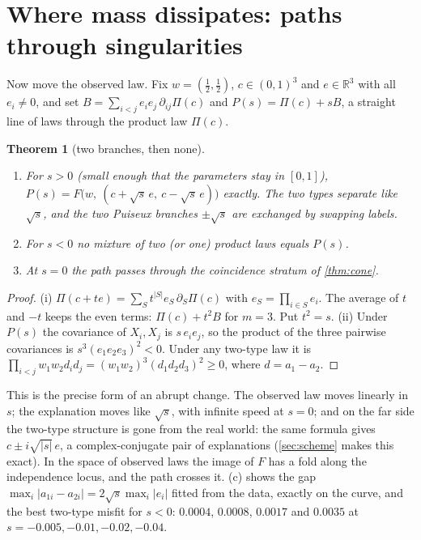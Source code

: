 \documentclass[11pt]{article}
\newtheorem{theorem}{Theorem}\newtheorem{proposition}[theorem]{Proposition}\newtheorem{corollary}[theorem]{Corollary}
\theoremstyle{definition}\newtheorem{definition}[theorem]{Definition}\newtheorem{remark}[theorem]{Remark}\newtheorem{example}[theorem]{Example}
\newcommand{\R}{\mathbb R}
\begin{document}
\section{Where mass dissipates: paths through singularities}\label{sec:puiseux}

Now move the observed law. Fix $w=(\tfrac12,\tfrac12)$, $c\in(0,1)^3$ and $e\in\R^3$ with all $e_i\neq0$, and set $B=\sum_{i<j}e_ie_j
\,\partial_{ij}\Pi(c)$ and $P(s)=\Pi(c)+sB$, a straight line of laws through the product law $\Pi(c)$.

\begin{theorem}[two branches, then none]\label{thm:puiseux}
\begin{enumerate}[label=(\roman*),leftmargin=*,itemsep=1pt]
\item For $s>0$ (small enough that the parameters stay in $[0,1]$), $P(s)=F\big(w,\ (c+\sqrt s\,e,\ c-\sqrt s\,e)\big)$ exactly. The two
types separate like $\sqrt s$, and the two Puiseux branches $\pm\sqrt s$ \cite{CasasAlvero2000} are exchanged by swapping labels.
\item For $s<0$ no mixture of two (or one) product laws equals $P(s)$.
\item At $s=0$ the path passes through the coincidence stratum of \cref{thm:cone}.
\end{enumerate}
\end{theorem}

\begin{proof}
(i) $\Pi(c+te)=\sum_S t^{|S|}e_S\,\partial_S\Pi(c)$ with $e_S=\prod_{i\in S}e_i$. The average of $t$ and $-t$ keeps the even terms:
$\Pi(c)+t^2B$ for $m=3$. Put $t^2=s$.
(ii) Under $P(s)$ the covariance of $X_i,X_j$ is $s\,e_ie_j$, so the product of the three pairwise covariances is $s^3(e_1e_2e_3)^2<0$.
Under any two-type law it is $\prod_{i<j}w_1w_2d_id_j=(w_1w_2)^3(d_1d_2d_3)^2\ge0$, where $d=a_1-a_2$.
\end{proof}

This is the precise form of an abrupt change. The observed law moves linearly in $s$; the explanation moves like $\sqrt s$, with
infinite speed at $s=0$; and on the far side the two-type structure is gone from the real world: the same formula gives
$c\pm i\sqrt{|s|}\,e$, a complex-conjugate pair of explanations (\cref{sec:scheme} makes this exact). In the space of observed laws the image of $F$ has a fold
along the independence locus, and the path crosses it. (c) shows the gap $\max_i|a_{1i}-a_{2i}|=2\sqrt s\max_i|e_i|$ fitted
from the data, exactly on the curve, and the best two-type misfit for $s<0$: $0.0004$, $0.0008$, $0.0017$ and $0.0035$ at
$s=-0.005,-0.01,-0.02,-0.04$.
\end{document}
